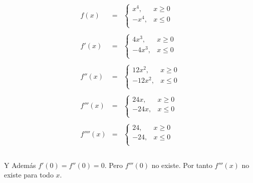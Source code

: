 \begin{enumerate}[\bfseries 1]
\begin{enumerate}[(a)]
		$$\begin{array}{rcl}
		    f(x) & = & \left\{ \begin{array}{rl}
			    x^4,& x\geq 0 \\
			    -x^4,& x\leq 0 \\
		    \end{array}\right.\\\\
		    f'(x) & = & \left\{ \begin{array}{rl}
			    4x^3,& x\geq 0 \\
			    -4x^3,& x\leq 0 \\
		    \end{array}\right.\\\\
		    f''(x) & = & \left\{ \begin{array}{rl}
			    12x^2,& x\geq 0 \\
			    -12x^2,& x\leq 0 \\
		    \end{array}\right.\\\\
		    f'''(x) & = & \left\{ \begin{array}{rl}
			    24x,& x\geq 0 \\
			    -24x,& x\leq 0 \\
		    \end{array}\right.\\\\
		    f''''(x) & = & \left\{ \begin{array}{rl}
			    24,& x\geq 0 \\
			    -24,& x\leq 0 \\
		    \end{array}\right.\\\\
		\end{array}$$

		Y Además $f'(0)=f''(0)=0$. Pero $f'''(0)$ no existe. Por tanto $f'''(x)$ no existe para todo $x$.\\\\

	\end{enumerate}


\end{enumerate}
